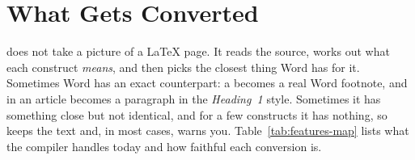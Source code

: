 \section{What Gets Converted}\label{sec:features}

\texdocx{} does not take a picture of a \LaTeX{} page. It reads the source,
works out what each construct \emph{means}, and then picks the closest thing
Word has for it. Sometimes Word has an exact counterpart: a 
becomes a real Word footnote, and in an article  becomes a paragraph in
the \emph{Heading~1} style. Sometimes it has something close but not identical, and
for a few constructs it has nothing, so \texdocx{} keeps the text and, in most
cases, warns you.
Table~\ref{tab:features-map} lists what the compiler handles today and how
faithful each conversion is.

